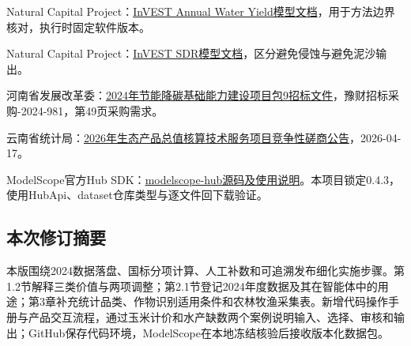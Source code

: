 \documentclass[12pt,a4paper,fontset=fandol]{ctexart}
\begin{document}
\begin{enumerate}[label={[\arabic*]}]
\item Natural Capital Project：\href{https://storage.googleapis.com/releases.naturalcapitalproject.org/invest-userguide/latest/en/annual_water_yield.html}{InVEST Annual Water Yield模型文档}，用于方法边界核对，执行时固定软件版本。
\item Natural Capital Project：\href{https://storage.googleapis.com/releases.naturalcapitalproject.org/invest-userguide/latest/en/sdr.html}{InVEST SDR模型文档}，区分避免侵蚀与避免泥沙输出。
\item 河南省发展改革委：\href{https://sanmenxia.zfcg.henan.gov.cn/cmsweb81e27e/henan/rootfiles/2024/10/10/30b0c7e39e1d4f029e0b7384127972e8.pdf}{2024年节能降碳基础能力建设项目包9招标文件}，豫财招标采购-2024-981，第49页采购需求。
\item 云南省统计局：\href{https://www.ccgp.gov.cn/cggg/dfgg/jzxcs/202604/t20260417_26423542.htm}{2026年生态产品总值核算技术服务项目竞争性磋商公告}，2026-04-17。
\item ModelScope官方Hub SDK：\href{https://github.com/modelscope/modelscope_hub}{modelscope-hub源码及使用说明}。本项目锁定0.4.3，使用HubApi、dataset仓库类型与逐文件回下载验证。
\end{enumerate}

\subsection{本次修订摘要}
本版围绕2024数据落盘、国标分项计算、人工补数和可追溯发布细化实施步骤。第1.2节解释三类价值与两项调整；第2.1节登记2024年度数据及其在智能体中的用途；第3章补充统计品类、作物识别适用条件和农林牧渔采集表。新增代码操作手册与产品交互流程，通过玉米计价和水产缺数两个案例说明输入、选择、审核和输出；GitHub保存代码环境，ModelScope在本地冻结核验后接收版本化数据包。
\end{document}
